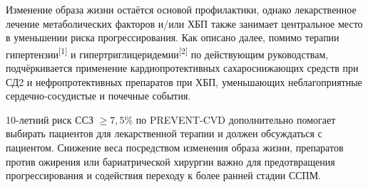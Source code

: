 \documentclass[11pt,a4paper]{article}
\newcommand{\src}[1]{\textsuperscript{[#1]}}
\begin{document}
Изменение образа жизни остаётся основой профилактики, однако лекарственное лечение метаболических факторов и/или ХБП также занимает центральное место в уменьшении риска прогрессирования. Как описано далее, помимо терапии гипертензии\src{1} и гипертриглицеридемии\src{2} по действующим руководствам, подчёркивается применение кардиопротективных сахароснижающих средств при СД2 и нефропротективных препаратов при ХБП, уменьшающих неблагоприятные сердечно-сосудистые и почечные события.

10-летний риск ССЗ $\geq7{,}5\%$ по PREVENT-CVD дополнительно помогает выбирать пациентов для лекарственной терапии и должен обсуждаться с пациентом. Снижение веса посредством изменения образа жизни, препаратов против ожирения или бариатрической хирургии важно для предотвращения прогрессирования и содействия переходу к более ранней стадии ССПМ.
\end{document}
